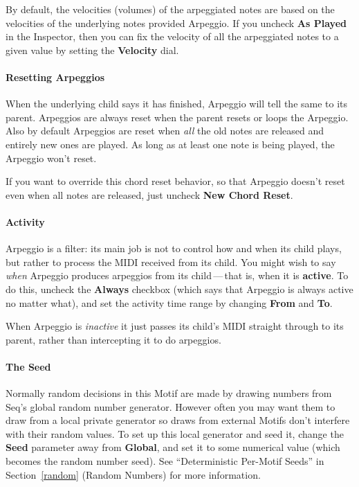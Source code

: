 \documentclass[twoside,10pt]{article}
\begin{document}
By default, the velocities (volumes) of the arpeggiated notes are based on the velocities of the underlying notes provided Arpeggio.  If you uncheck {\bf As Played} in the Inspector, then you can fix the velocity of all the arpeggiated notes to a given value by setting the {\bf Velocity} dial.

\paragraph{Resetting Arpeggios}

When the underlying child says it has finished, Arpeggio will tell the same to its parent.  Arpeggios are always reset when the parent resets or loops the Arpeggio.  Also by default Arpeggios are reset when {\it all} the old notes are released and entirely new ones are played. As long as at least one note is being played, the Arpeggio won't reset.

If you want to override this chord reset behavior, so that Arpeggio doesn't reset even when all notes are released, just uncheck {\bf New Chord Reset}.

\paragraph{Activity}

Arpeggio is a filter: its main job is not to control how and when its child plays, but rather to process the MIDI received from its child.  You might wish to say {\it when} Arpeggio produces arpeggios from its child\,---\,that is,  when it is {\bf active}.  To do this, uncheck the {\bf Always} checkbox (which says that Arpeggio is always active no matter what), and set the activity time range by changing {\bf From} and {\bf To}.  

When Arpeggio is {\it inactive} it just passes its child's MIDI straight through to its parent, rather than intercepting it to do arpeggios.

\paragraph{The Seed}

Normally random decisions in this Motif are made by drawing numbers from Seq's global random number generator.  However often you may want them to draw from a local private generator so draws from external Motifs don't interfere with their random values.  To set up this local generator and seed it, change the {\bf Seed} parameter away from {\bf Global}, and set it to some numerical value (which becomes the random number seed).  See ``Deterministic Per-Motif Seeds'' in Section~\ref{random} (Random Numbers) for more information.
\end{document}
